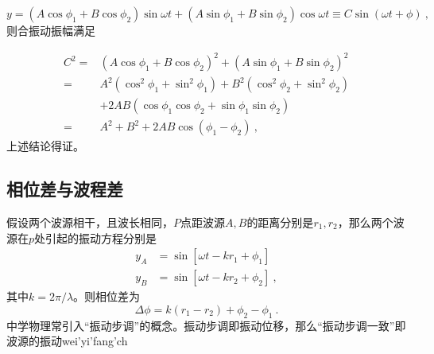 \begin{equation}
y=\left(A \cos \phi_1+B \cos \phi_2\right) \sin \omega t+\left(A \sin \phi_1+B \sin \phi_2\right) \cos \omega t\equiv C\sin (\omega t+\phi)~,
\end{equation}
则合振动振幅满足

\begin{equation}
\begin{aligned}
C^2
= & \left(A \cos \phi_1+B \cos \phi_2\right)^2+\left(A \sin \phi_1+B \sin \phi_2\right)^2 \\
= & A^2\left(\cos ^2 \phi_1+\sin ^2 \phi_1\right)+B^2\left(\cos ^2 \phi_2+\sin ^2 \phi_2\right) \\
& +2 A B\left(\cos \phi_1 \cos \phi_2+\sin \phi_1 \sin \phi_2\right) \\
= & A^2+B^2+2 A B \cos \left(\phi_1-\phi_2\right)~,
\end{aligned}
\end{equation}
上述结论得证。
\subsection{相位差与波程差}
假设两个波源相干，且波长相同，$P$点距波源$A,B$的距离分别是$r_1,r_2$，那么两个波源在$p$处引起的振动方程分别是
\begin{equation}
\begin{aligned}
y_A&=\sin[\omega t-kr_1+\phi_1]\\
y_B&=\sin[\omega t-kr_2+\phi_2]~,
\end{aligned}
\end{equation}
其中$k=2\pi/\lambda$。则相位差为
\begin{equation}
\Delta\phi=k(r_1-r_2)+\phi_2-\phi_1~.
\end{equation}
中学物理常引入“振动步调”的概念。振动步调即振动位移，那么“振动步调一致”即波源的振动wei'yi'fang'ch